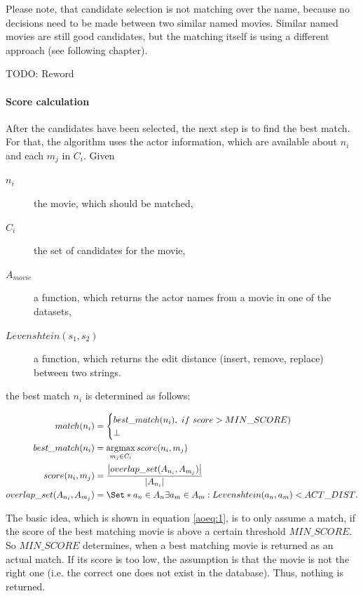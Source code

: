 Please note, that candidate selection is not matching over the name, because no decisions need to be made between two similar named movies.
Similar named movies are still good candidates, but the matching itself is using a different approach (see following chapter).

TODO: Reword

\paragraph{Score calculation}
After the candidates have been selected, the next step is to find the best match.
For that, the algorithm uses the actor information, which are available about $n_i$ and each $m_j$ in $C_i$.
Given
\begin{description}
	\item[$n_i$] the movie, which should be matched,
	\item[$C_i$] the set of candidates for the movie,
	\item[$A_{movie}$] a function, which returns the actor names from a movie in one of the datasets,
	\item[$Levenshtein(s_1, s_2)$] a function, which returns the edit distance (insert, remove, replace) between two strings.
\end{description}
the best match $n_i$ is determined as follows:

\begin{align}
	match(n_i) &=
		\begin{cases}
			best\_match(n_i),~if~score > MIN\_SCORE) \\
			\bot
		\end{cases}\label{aoeq:1}\\
	best\_match(n_i) &=
		\argmax_{m_j \in C_i} score(n_i, m_j)\label{aoeq:2}\\
	score(n_i, m_j) &=
		\frac
			{\left\lvert overlap\_set(A_{n_i}, A_{m_j}) \right\rvert}
			{\left\lvert A_{n_i} \right\rvert}\label{aoeq:3}\\
	overlap\_set(A_{n_i}, A_{m_j}) &=
		\Set*{a_n \in A_n}{\exists a_m \in A_m: Levenshtein(a_n, a_m) < ACT\_DIST}.\label{aoeq:4}
\end{align}

The basic idea, which is shown in equation \ref{aoeq:1}, is to only assume a match, if the score of the best matching movie is above a certain threshold $MIN\_SCORE$.
So $MIN\_SCORE$ determines, when a best matching movie is returned as an actual match.
If its score is too low, the assumption is that the movie is not the right one (i.e. the correct one does not exist in the database).
Thus, nothing is returned.

